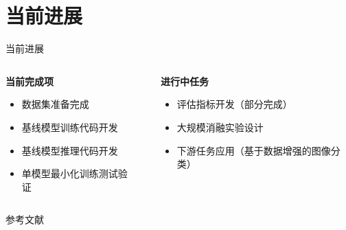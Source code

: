 \documentclass[11pt,aspectratio=169]{beamer}
\begin{document}
\section{当前进展}
\begin{frame}{当前进展}
    \begin{columns}
        \begin{column}{0.48\textwidth}
            \textbf{当前完成项~\checkmark}
            \begin{itemize}
                \item 数据集准备完成
                \item 基线模型训练代码开发
                \item 基线模型推理代码开发
                \item 单模型最小化训练测试验证
            \end{itemize}
        \end{column}
        \begin{column}{0.04\textwidth}
        \end{column}
        \begin{column}{0.48\textwidth}
            \textbf{进行中任务}
            \begin{itemize}
                \item 评估指标开发（部分完成）
                \item 大规模消融实验设计
                \item 下游任务应用（基于数据增强的图像分类）
            \end{itemize}
        \end{column}
    \end{columns}
\end{frame}


\begin{frame}[allowframebreaks]{参考文献}
    
\end{frame}
\end{document}
